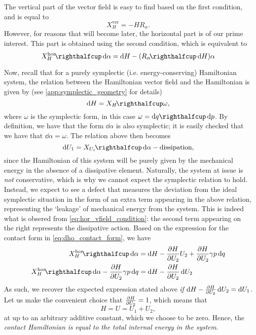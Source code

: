 The vertical part of the vector field is easy to find based on the first condition, and is equal to
$$ X_H^\text{ver} = -H R_\alpha. $$
However, for reasons that will become later, the horizontal part is of our prime interest. This part is obtained using the second condition, which is equivalent to
\begin{equation}
    \intpr{X_H^\text{hor}}{\dd{\alpha}} = \dd{H} - (\intpr{R_\alpha}{\dd{H}}) \alpha 
    \label{eq:hor_vfield_condition}
\end{equation}

Now, recall that for a purely symplectic (i.e. energy-conserving) Hamiltonian system, the relation between the Hamiltonian vector field and the Hamiltonian is given by (see \cref{app:symplectic_geometry} for details) 
$$ \dd{H} = \intpr{X_H}{\omega}, $$
where $\omega$ is the symplectic form, in this case $\omega = \intpr{\dd{q}}{\dd{p}}$. By definition, we have that the form $\dd{\alpha}$ is also symplectic; it is easily checked that we have that $\dd{\alpha} = \omega$. The relation above then becomes 
$$ \dd{U_1} = \intpr{X_{U_1}}{\dd{\alpha}} - \text{dissipation}, $$
since the Hamiltonian of this system will be purely given by the mechanical energy in the absence of a dissipative element. Naturally, the system at issue is \emph{not} conservative, which is why we cannot expect the symplectic relation to hold. Instead, we expect to see a defect that measures the deviation from the ideal symplectic situation in the form of an extra term appearing in the above relation, representing the `leakage' of mechanical energy from the system. This is indeed what is obsered from \cref{eq:hor_vfield_condition}: the second term appearing on the right represents the dissipative action. Based on the expression for the contact form in \cref{eq:dho_contact_form}, we have
\begin{equation} 
    \begin{split}
        \intpr{X_H^\text{hor}}{\dd{\alpha}} &= \dd{H}  - \pdv{H}{U_2}U_2 + \pdv{H}{U_2}\gamma p\dd{q} \\
        \intpr{X_H^\text{hor}}{\dd{\alpha}} - \pdv{H}{U_2}\gamma p\dd{q} &= \dd{H}  - \pdv{H}{U_2}\dd{U_2}
    \end{split}
\end{equation}
As such, we recover the expected expression stated above \emph{if} $\dd{H} - \pdv{H}{U_2}\dd{U_2} = \dd{U_1}$. Let us make the convenient choice that $\pdv{H}{U_2} = 1$, which means that 
$$ H = U = U_1 + U_2, $$
at up to an arbitrary additive constant, which we choose to be zero. Hence, the \emph{contact Hamiltonian is equal to the total internal energy in the system}.


